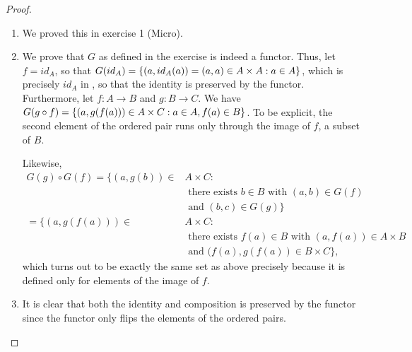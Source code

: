 \begin{proof}
\begin{enumerate}
    \item We proved this in exercise 1 (Micro).
    
    \item We prove that $G$ as defined in the exercise is indeed a functor.
    Thus, let $f = id_A$, so that $G(id_A) = \{(a, id_A(a)) = (a, a) \in A \times A: a \in A\}$, which is precisely $id_A$ in \Rel, so that the identity is preserved by the functor. 
    Furthermore, let $f: A \to B$ and $g: B \to C$.
    We have $G(g \circ f) = \{(a, g(f(a))) \in A \times C: a \in A, f(a) \in B\}$.
    To be explicit, the second element of the ordered pair runs only through the image of $f$, a subset of $B$.
    
    Likewise, 
    \begin{align*}
        G(g) \circ G(f) 
        = \{(a, g(b)) \in& A \times C:\\ 
        &\text{ there exists } b \in B \text{ with } (a, b) \in G(f) \\
        &\text{ and } (b, c) \in G(g)\}\\
        = \{(a, g(f(a))) \in& A \times C:\\
        &\text{ there exists } f(a) \in B \text{ with } (a, f(a)) \in A \times B\\ 
        &\text{ and } (f(a), g(f(a)) \in B \times C\},
    \end{align*}
    which turns out to be exactly the same set as above precisely because it is defined only for elements of the image of $f$.
    
    \item It is clear that both the identity and composition is preserved by the functor since the functor only flips the elements of the ordered pairs.
\end{enumerate}
\end{proof} 

